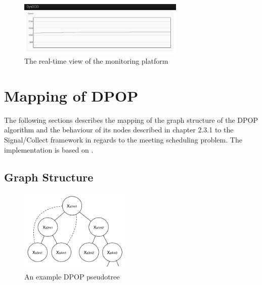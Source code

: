 \begin{figure}[H]
\includegraphics[width=300px]{graphics/monitoring}
\centering
\caption{The real-time view of the monitoring platform}
\label{fig:monitoring}
\end{figure}

\section{Mapping of DPOP}

The following sections describes the mapping of the graph structure of the DPOP algorithm and the behaviour of its nodes described in chapter 2.3.1 to the Signal/Collect framework  in regards to the meeting scheduling problem. The implementation is based on \cite{Petcu2003}.

\subsection{Graph Structure}
\begin{figure}[h]
\includegraphics[width=200px]{graphics/dpop_graph}
\centering
\caption{An example DPOP pseudotree}
\label{fig:dpop_graph}
\end{figure}

